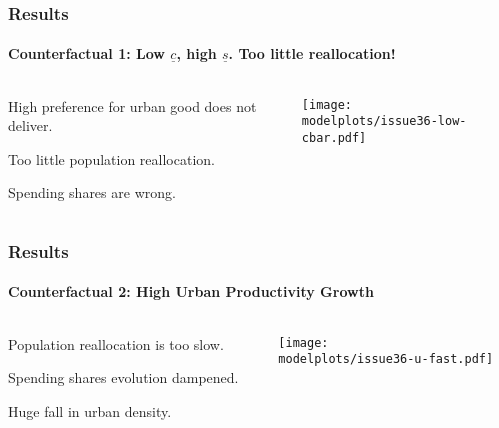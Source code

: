 \documentclass[aspectratio=169]{beamer}
\begin{document}
\begin{frame}
\frametitle{Results}
\framesubtitle{Counterfactual 1: Low $\underline{c}$, high $\underline{s}$. Too little reallocation!}

\begin{columns}
\begin{column}{0.3\textwidth}
\begin{midi}
\item High preference for urban good does not deliver.
\item Too little population reallocation.
\item Spending shares are wrong.
\end{midi}
\end{column}
\begin{column}{0.7\textwidth}
\begin{adjustbox}{center}
\texttt{[image: \\modelplots/issue36-low-cbar.pdf]}\end{adjustbox}
\end{column}\end{columns}
\end{frame}

\begin{frame}
\frametitle{Results}
\framesubtitle{Counterfactual 2: High Urban Productivity Growth}

\begin{columns}
\begin{column}{0.3\textwidth}
\begin{midi}
\item Population reallocation is too slow.
\item Spending shares evolution dampened.
\item Huge fall in urban density.
\end{midi}
\end{column}
\begin{column}{0.7\textwidth}
\begin{adjustbox}{center}
\texttt{[image: \\modelplots/issue36-u-fast.pdf]}\end{adjustbox}
\end{column}\end{columns}
\end{frame}
\end{document}
